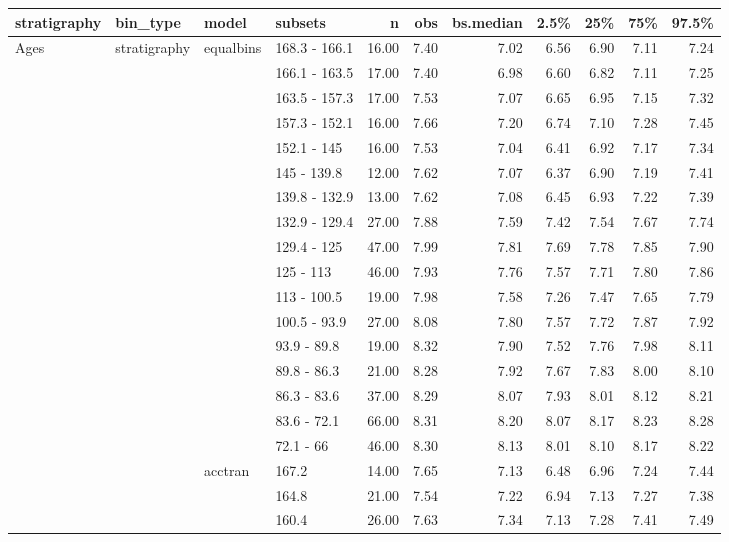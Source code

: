 \begin{longtable}{llllrrrrrrr}
  \hline
stratigraphy & bin\_type & model & subsets & n & obs & bs.median & 2.5\% & 25\% & 75\% & 97.5\% \\ 
  \hline
Ages & stratigraphy & equalbins & 168.3 - 166.1 & 16.00 & 7.40 & 7.02 & 6.56 & 6.90 & 7.11 & 7.24 \\ 
   &  &  & 166.1 - 163.5 & 17.00 & 7.40 & 6.98 & 6.60 & 6.82 & 7.11 & 7.25 \\ 
   &  &  & 163.5 - 157.3 & 17.00 & 7.53 & 7.07 & 6.65 & 6.95 & 7.15 & 7.32 \\ 
   &  &  & 157.3 - 152.1 & 16.00 & 7.66 & 7.20 & 6.74 & 7.10 & 7.28 & 7.45 \\ 
   &  &  & 152.1 - 145 & 16.00 & 7.53 & 7.04 & 6.41 & 6.92 & 7.17 & 7.34 \\ 
   &  &  & 145 - 139.8 & 12.00 & 7.62 & 7.07 & 6.37 & 6.90 & 7.19 & 7.41 \\ 
   &  &  & 139.8 - 132.9 & 13.00 & 7.62 & 7.08 & 6.45 & 6.93 & 7.22 & 7.39 \\ 
   &  &  & 132.9 - 129.4 & 27.00 & 7.88 & 7.59 & 7.42 & 7.54 & 7.67 & 7.74 \\ 
   &  &  & 129.4 - 125 & 47.00 & 7.99 & 7.81 & 7.69 & 7.78 & 7.85 & 7.90 \\ 
   &  &  & 125 - 113 & 46.00 & 7.93 & 7.76 & 7.57 & 7.71 & 7.80 & 7.86 \\ 
   &  &  & 113 - 100.5 & 19.00 & 7.98 & 7.58 & 7.26 & 7.47 & 7.65 & 7.79 \\ 
   &  &  & 100.5 - 93.9 & 27.00 & 8.08 & 7.80 & 7.57 & 7.72 & 7.87 & 7.92 \\ 
   &  &  & 93.9 - 89.8 & 19.00 & 8.32 & 7.90 & 7.52 & 7.76 & 7.98 & 8.11 \\ 
   &  &  & 89.8 - 86.3 & 21.00 & 8.28 & 7.92 & 7.67 & 7.83 & 8.00 & 8.10 \\ 
   &  &  & 86.3 - 83.6 & 37.00 & 8.29 & 8.07 & 7.93 & 8.01 & 8.12 & 8.21 \\ 
   &  &  & 83.6 - 72.1 & 66.00 & 8.31 & 8.20 & 8.07 & 8.17 & 8.23 & 8.28 \\ 
   &  &  & 72.1 - 66 & 46.00 & 8.30 & 8.13 & 8.01 & 8.10 & 8.17 & 8.22 \\ 
   &  & acctran & 167.2 & 14.00 & 7.65 & 7.13 & 6.48 & 6.96 & 7.24 & 7.44 \\ 
   &  &  & 164.8 & 21.00 & 7.54 & 7.22 & 6.94 & 7.13 & 7.27 & 7.38 \\ 
   &  &  & 160.4 & 26.00 & 7.63 & 7.34 & 7.13 & 7.28 & 7.41 & 7.49 \\ 

\end{longtable}
